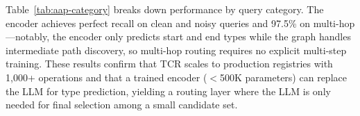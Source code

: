 Table~\ref{tab:aap-category} breaks down performance by query category.
The encoder achieves perfect recall on clean and noisy queries and 97.5\% on multi-hop---notably, the encoder only predicts start and end types while the graph handles intermediate path discovery, so multi-hop routing requires no explicit multi-step training.
These results confirm that TCR scales to production registries with 1,000+ operations and that a trained encoder ($<$500K parameters) can replace the LLM for type prediction, yielding a routing layer where the LLM is only needed for final selection among a small candidate set.
